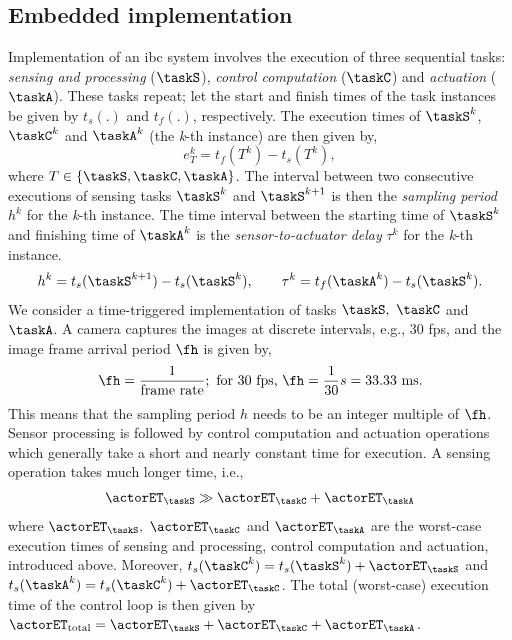 \subsection{Embedded implementation}
\label{sec:ch5_embedded_implementation}
Implementation of an \gls{ibc} system involves the execution of three sequential tasks: \emph{sensing and processing} ($\taskS$), \emph{control computation} ($\taskC$) and \emph{actuation} ($\taskA$). These tasks repeat; let the start and finish times of the task instances be given by $t_s(.)$ and $t_f(.)$, respectively. The execution times of $\taskS^k$, $\taskC^k$ and $\taskA^k$ (the \emph{k}-th instance) are then given by,
\begin{equation}%
  e^k_{T} = t_f(T^k) - t_s(T^k),\nonumber
\end{equation}
where $T \in \{\taskS, \taskC, \taskA\}$.
The interval between two consecutive executions of sensing tasks $\taskS^k$ and $\taskS^{k+1}$ is then the \emph{sampling period} $h^k$ for the \emph{k}-th instance.
The time interval between the starting time of $\taskS^k$ and finishing time of $\taskA^k$ is the \emph{sensor-to-actuator delay} $\tau^k$ for the \emph{k}-th instance.
\begin{eqnarray}
h^k = t_s(\taskS^{k+1}) - t_s(\taskS^{k}),\hspace{2em} \tau^k = t_f(\taskA^{k}) - t_s(\taskS^{k}).
\nonumber
\end{eqnarray}
We consider a time-triggered implementation of tasks $\taskS,\ \taskC$ and $\taskA$.
A camera captures the images
at discrete intervals, e.g., 30 fps, and the image frame arrival period $\fh$ is given by,
\begin{eqnarray}
\fh=\frac{1}{\text{frame rate}}; \text{ for 30 fps, } \fh=\frac{1}{30}s=33.33\ \text{ms}.\nonumber
\end{eqnarray}
This means that the sampling period $h$ needs to be an
integer multiple of $\fh$.
Sensor processing is followed by control computation and actuation operations which generally take a short and nearly constant time for execution.
A sensing operation takes much longer time, i.e.,
\begin{eqnarray}
\actorET_\taskS \gg \actorET_\taskC + \actorET_\taskA\nonumber
\end{eqnarray}
where $\actorET_\taskS,\ \actorET_\taskC$ and $\actorET_\taskA$ are the worst-case execution times of sensing and processing, control computation and actuation, introduced above. Moreover, $t_s(\taskC^k) = t_s(\taskS^k) + \actorET_\taskS$ and $t_s(\taskA^k) = t_s(\taskC^k) + \actorET_\taskC$.
The total (worst-case) execution time of the control loop is then given by $\actorET_{\text{total}} = \actorET_\taskS+\actorET_\taskC+\actorET_\taskA$.


